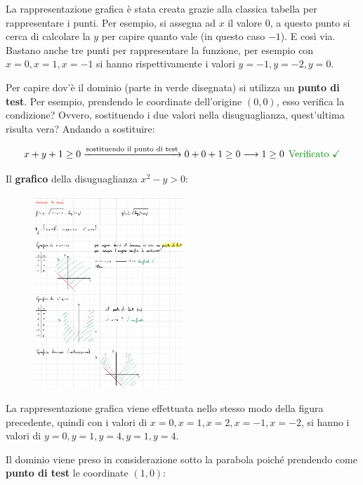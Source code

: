 \documentclass[a4paper]{article}
\begin{document}
	\noindent
	La rappresentazione grafica è stata creata grazie alla classica tabella per rappresentare i punti. Per esempio, si assegna ad $x$ il valore $0$, a questo punto si cerca di calcolare la $y$ per capire quanto vale (in questo caso $-1$). E così via. Bastano anche tre punti per rappresentare la funzione, per esempio con $x = 0, x = 1, x = -1$ si hanno rispettivamente i valori $y = -1, y = -2, y = 0$.
	
	Per capire dov'è il dominio (parte in verde disegnata) si utilizza un \textbf{punto di test}. Per esempio, prendendo le coordinate dell'origine $\left(0,0\right)$, esso verifica la condizione? Ovvero, sostituendo i due valori nella disuguaglianza, quest'ultima risulta vera? Andando a sostituire:
	
	\begin{equation*}
		x+y+1 \ge 0 \xrightarrow{\text{sostituendo il punto di test}} 0 + 0 + 1 \ge 0 \longrightarrow 1 \ge 0 \:\: \textcolor{Green4}{\text{Verificato \checkmark}}
	\end{equation*}

	\newpage
	
	\noindent
	Il \textbf{grafico} della disuguaglianza $x^{2} - y > 0$:
	
	\begin{figure}[!htp]
		\centering
		\includegraphics[width=0.5\textwidth]{img/ex1_esame2.pdf}
	\end{figure}

	\noindent
	La rappresentazione grafica viene effettuata nello stesso modo della figura precedente, quindi con i valori di $x = 0, x = 1, x = 2, x = -1, x = -2$, si hanno i valori di $y = 0, y = 1, y = 4, y = 1, y = 4$.
	
	Il dominio viene preso in considerazione sotto la parabola poiché prendendo come \textbf{punto di test} le coordinate $\left(1,0\right)$:
	
\end{document}
